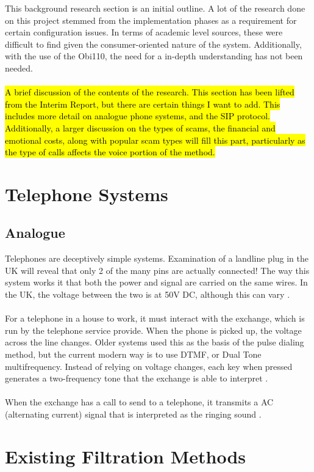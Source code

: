 \documentclass[main.tex]{subfiles}
\begin{document}
This background research section is an initial outline. A lot of the research done on this project stemmed from the implementation phases as a requirement for certain configuration issues. In terms of academic level sources, these were difficult to find given the consumer-oriented nature of the system. Additionally, with the use of the Obi110, the need for a in-depth understanding has not been needed.
\\\\
\hl{A brief discussion of the contents of the research. This section has been lifted from the Interim Report, but there are certain things I want to add. This includes more detail on analogue phone systems, and the SIP protocol. Additionally, a larger discussion on the types of scams, the financial and emotional costs, along with popular scam types will fill this part, particularly as the type of calls affects the voice portion of the method.}

\section{Telephone Systems}
\subsection{Analogue}
Telephones are deceptively simple systems. Examination of a landline plug in the UK will reveal that only 2 of the many pins are actually connected! The way this system works it that both the power and signal are carried on the same wires. In the UK, the voltage between the two is at 50V DC, although this can vary \cite{telephone}.
\\\\
For a telephone in a house to work, it must interact with the exchange, which is run by the telephone service provide. When the phone is picked up, the voltage across the line changes. Older systems used this as the basis of the pulse dialing method, but the current modern way is to use DTMF, or Dual Tone multifrequency. Instead of relying on voltage changes, each key when pressed generates a two-frequency tone that the exchange is able to interpret \cite{telephone}.
\\\\
When the exchange has a call to send to a telephone, it transmits a AC (alternating current) signal that is interpreted as the ringing sound \cite{telephone}.

\section{Existing Filtration Methods}
\end{document}
